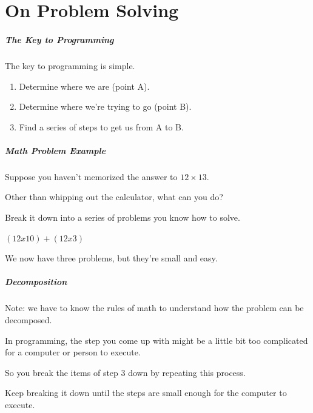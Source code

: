 \part{On Problem Solving}
\frame{\partpage}

\begin{frame}
\frametitle{The Key to Programming}
\begin{changemargin}{1cm}
The key to programming is simple.

\begin{enumerate}
\item Determine where we are (point A).
\item Determine where we're trying to go (point B).
\item Find a series of steps to get us from A to B.
\end{enumerate}

\end{changemargin}
\end{frame}

\begin{frame}
\frametitle{Math Problem Example}
\begin{changemargin}{1cm}

Suppose you haven't memorized the answer to $12 \times 13$. 

Other than whipping out the calculator, what can you do? 

Break it down into a series of problems you know how to solve.

$(12 x 10) + (12 x 3)$

We now have three problems, but they're small and easy.

\end{changemargin}
\end{frame}

\begin{frame}
\frametitle{Decomposition}
\begin{changemargin}{1cm}

Note: we have to know the rules of math to understand how the problem can be decomposed. 

In programming, the step you come up with might be a little bit too complicated for a computer or person to execute.

So you break the items of step 3 down by repeating this process.

Keep breaking it down until the steps are small enough for the computer to execute.

\end{changemargin}
\end{frame}

